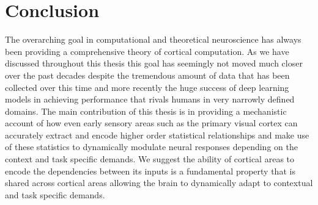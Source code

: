 \chapter{Conclusion}

The overarching goal in computational and theoretical neuroscience has
always been providing a comprehensive theory of cortical
computation. As we have discussed throughout this thesis this goal has
seemingly not moved much closer over the past decades despite the
tremendous amount of data that has been collected over this time and
more recently the huge success of deep learning models in achieving
performance that rivals humans in very narrowly defined domains. The
main contribution of this thesis is in providing a mechanistic account
of how even early sensory areas such as the primary visual cortex can
accurately extract and encode higher order statistical relationships
and make use of these statistics to dynamically modulate neural
responses depending on the context and task specific demands. We
suggest the ability of cortical areas to encode the dependencies
between its inputs is a fundamental property that is shared across
cortical areas allowing the brain to dynamically adapt to contextual
and task specific demands.
